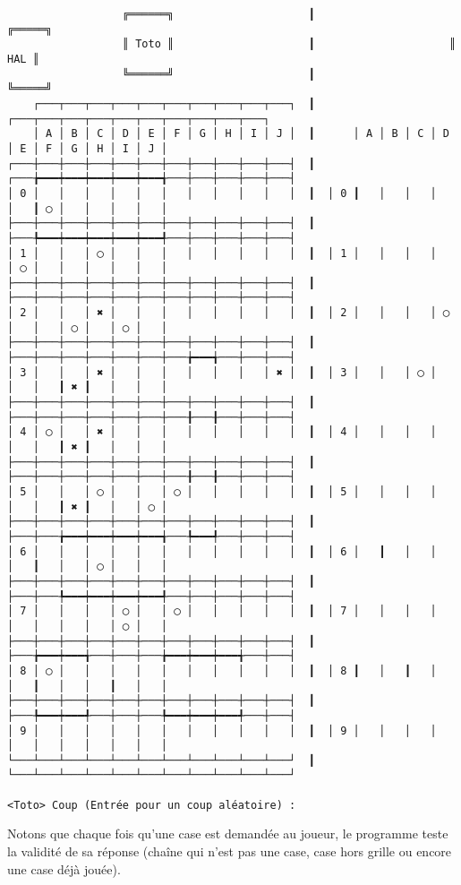 \begin{enumerate}
\label{deux_joueurs}{\scriptsize
\begin{verbatim}
                  ╔══════╗                     ┃                     ╔═════╗                   
                  ║ Toto ║                     ┃                     ║ HAL ║                   
                  ╚══════╝                     ┃                     ╚═════╝                   
    ┌───┬───┬───┬───┬───┬───┬───┬───┬───┬───┐  ┃      ┌───┬───┬───┬───┬───┬───┬───┬───┬───┬───┐
    │ A │ B │ C │ D │ E │ F │ G │ H │ I │ J │  ┃      │ A │ B │ C │ D │ E │ F │ G │ H │ I │ J │
┌───┼───┼───┼───┼───┼───┼───┼───┼───┼───┼───┤  ┃  ┌───╆━━━┿━━━┿━━━┿━━━┿━━━╅───┼───┼───┼───┼───┤
│ 0 │   │   │   │   │   │   │   │   │   │   │  ┃  │ 0 ┃   │   │   │   │   ┃ ◯ │   │   │   │   │
├───┼───┼───┼───┼───┼───┼───┼───┼───┼───┼───┤  ┃  ├───╄━━━┿━━━┿━━━┿━━━┿━━━╃───┼───┼───┼───┼───┤
│ 1 │   │   │ ◯ │   │   │   │   │   │   │   │  ┃  │ 1 │   │   │   │   │ ◯ │   │   │   │   │   │
├───┼───┼───┼───┼───┼───┼───┼───┼───┼───┼───┤  ┃  ├───┼───┼───┼───┼───┼───┼───┼───┼───┼───┼───┤
│ 2 │   │   │ ✖ │   │   │   │   │   │   │   │  ┃  │ 2 │   │   │   │ ◯ │   │   │ ◯ │   │ ◯ │   │
├───┼───┼───┼───┼───┼───┼───┼───┼───┼───┼───┤  ┃  ├───┼───┼───┼───┼───┼───┼───╆━━━╅───┼───┼───┤
│ 3 │   │   │ ✖ │   │   │   │   │   │   │ ✖ │  ┃  │ 3 │   │   │ ◯ │   │   │   ┃ ✖ ┃   │   │   │
├───┼───┼───┼───┼───┼───┼───┼───┼───┼───┼───┤  ┃  ├───┼───┼───┼───┼───┼───┼───╂───╂───┼───┼───┤
│ 4 │ ◯ │   │ ✖ │   │   │   │   │   │   │   │  ┃  │ 4 │   │   │   │   │   │   ┃ ✖ ┃   │   │   │
├───┼───┼───┼───┼───┼───┼───┼───┼───┼───┼───┤  ┃  ├───┼───┼───┼───┼───┼───┼───╂───╂───┼───┼───┤
│ 5 │   │   │ ◯ │   │   │ ◯ │   │   │   │   │  ┃  │ 5 │   │   │   │   │   │   ┃ ✖ ┃   │   │ ◯ │
├───┼───┼───┼───┼───┼───┼───┼───┼───┼───┼───┤  ┃  ├───┼───╆━━━┿━━━┿━━━┿━━━╅───╄━━━╃───┼───┼───┤
│ 6 │   │   │   │   │   │   │   │   │   │   │  ┃  │ 6 │   ┃   │   │   │   ┃   │   │ ◯ │   │   │
├───┼───┼───┼───┼───┼───┼───┼───┼───┼───┼───┤  ┃  ├───┼───╄━━━┿━━━┿━━━┿━━━╃───┼───┼───┼───┼───┤
│ 7 │   │   │   │ ◯ │   │ ◯ │   │   │   │   │  ┃  │ 7 │   │   │   │   │   │   │   │   │ ◯ │   │
├───┼───┼───┼───┼───┼───┼───┼───┼───┼───┼───┤  ┃  ├───╆━━━┿━━━╅───┼───┼───╆━━━┿━━━┿━━━╅───┼───┤
│ 8 │ ◯ │   │   │   │   │   │   │   │   │   │  ┃  │ 8 ┃   │   ┃   │   │   ┃   │   │   ┃   │   │
├───┼───┼───┼───┼───┼───┼───┼───┼───┼───┼───┤  ┃  ├───╄━━━┿━━━╃───┼───┼───╄━━━┿━━━┿━━━╃───┼───┤
│ 9 │   │   │   │   │   │   │   │   │   │   │  ┃  │ 9 │   │   │   │   │   │   │   │   │   │   │
└───┴───┴───┴───┴───┴───┴───┴───┴───┴───┴───┘  ┃  └───┴───┴───┴───┴───┴───┴───┴───┴───┴───┴───┘

<Toto> Coup (Entrée pour un coup aléatoire) : 
\end{verbatim}
}
\normalsize

\end{enumerate}


Notons que chaque fois qu'une case est demandée au joueur, le programme teste la validité de sa réponse (chaîne qui n'est pas une case, case hors grille ou encore une case déjà jouée).